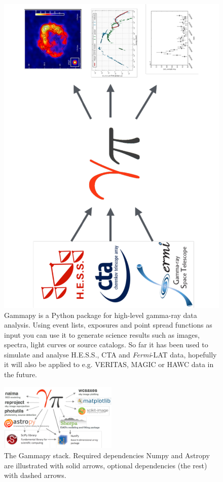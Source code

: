 \begin{figure}[t]
\centering
\includegraphics[height=0.5\textwidth, angle=270]{figures/gammapy-big-picture}
\caption{
Gammapy is a Python package for high-level gamma-ray data analysis. Using event
lists, exposures and point spread functions as input you can use it to generate
science results such as images, spectra, light curves or source catalogs. So far
it has been used to simulate and analyse H.E.S.S., CTA and \textit{Fermi}-LAT
data, hopefully it will also be applied to e.g. VERITAS, MAGIC or HAWC data in
the future.
}
\label{fig:big-picture}
\end{figure}

\begin{figure}[t]
\centering
\includegraphics[width=0.5\textwidth]{figures/gammapy-dependencies}
\caption{
The Gammapy stack. Required dependencies Numpy and Astropy are illustrated with
solid arrows, optional dependencies (the rest) with dashed arrows.
}
\label{fig:dependencies}
\end{figure}

